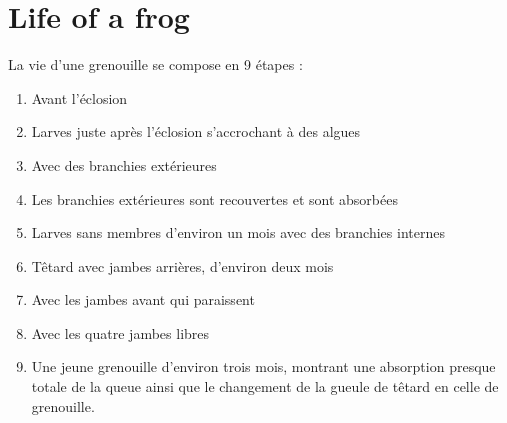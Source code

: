 \documentclass[10pt,a4paper]{article}
\date {14 décembre 2018}
\author{Groupe Introduction à \LaTeX}
\begin{document}
\section{Life of a frog}
La vie d'une grenouille se compose en 9 étapes :
	\begin{enumerate}
	\item Avant l'éclosion
   \item Larves juste après l'éclosion s'accrochant à des algues
   \item Avec des branchies extérieures
   \item Les branchies extérieures sont recouvertes et sont absorbées
   \item Larves sans membres d'environ un mois avec des branchies internes
   \item Têtard avec jambes arrières, d'environ deux mois
   \item Avec les jambes avant qui paraissent
   \item Avec les quatre jambes libres
   \item Une jeune grenouille d'environ trois mois, montrant une absorption presque totale de la queue ainsi que le changement de la gueule de têtard en celle de grenouille.
			\end{enumerate}
\end{document}
